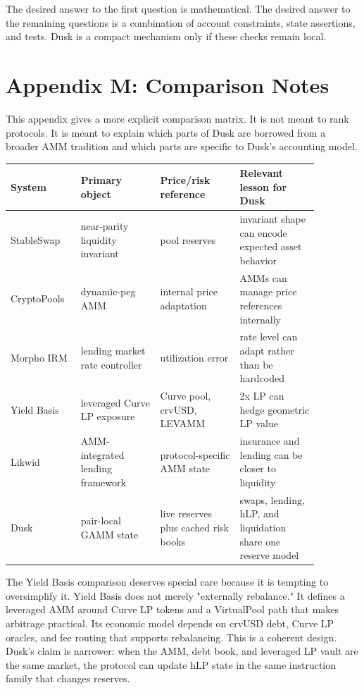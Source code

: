 \documentclass[11pt]{article}
\begin{document}
The desired answer to the first question is mathematical. The desired answer to the remaining questions is a combination of account constraints, state assertions, and tests. Dusk is a compact mechanism only if these checks remain local.

\section{Appendix M: Comparison Notes}

This appendix gives a more explicit comparison matrix. It is not meant to rank protocols. It is meant to explain which parts of Dusk are borrowed from a broader AMM tradition and which parts are specific to Dusk's accounting model.

\begin{center}
\begin{tabular}{p{0.18\linewidth}p{0.23\linewidth}p{0.23\linewidth}p{0.23\linewidth}}
\toprule
System & Primary object & Price/risk reference & Relevant lesson for Dusk \\
\midrule
StableSwap & near-parity liquidity invariant & pool reserves & invariant shape can encode expected asset behavior \\
CryptoPools & dynamic-peg AMM & internal price adaptation & AMMs can manage price references internally \\
Morpho IRM & lending market rate controller & utilization error & rate level can adapt rather than be hardcoded \\
Yield Basis & leveraged Curve LP exposure & Curve pool, crvUSD, LEVAMM & 2x LP can hedge geometric LP value \\
Likwid & AMM-integrated lending framework & protocol-specific AMM state & insurance and lending can be closer to liquidity \\
Dusk & pair-local GAMM state & live reserves plus cached risk books & swaps, lending, hLP, and liquidation share one reserve model \\
\bottomrule
\end{tabular}
\end{center}

The Yield Basis comparison deserves special care because it is tempting to oversimplify it. Yield Basis does not merely "externally rebalance." It defines a leveraged AMM around Curve LP tokens and a VirtualPool path that makes arbitrage practical. Its economic model depends on crvUSD debt, Curve LP oracles, and fee routing that supports rebalancing. This is a coherent design. Dusk's claim is narrower: when the AMM, debt book, and leveraged LP vault are the same market, the protocol can update hLP state in the same instruction family that changes reserves.
\end{document}
